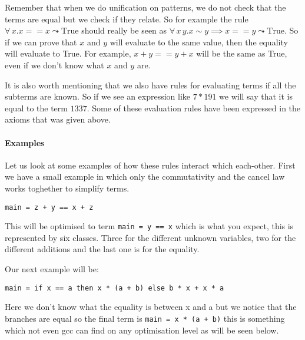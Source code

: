 Remember that when we do unification on patterns, we do not check that the terms
are equal but we check if they relate. So for example the rule $\forall \, x. x == x \leadsto \text{True}$
should really be seen as $\forall \, x \, y. x \sim y \implies x == y \leadsto \text{True}$.
So if we can prove that $x$ and $y$ will evaluate to the same value, then the equality
will evaluate to True. For example, $x + y == y + x$ will be the same as True, even
if we don't know what $x$ and $y$ are.

It is also worth mentioning that we also have rules for evaluating terms if all
the subterms are known. So if we see an expression like $7 * 191$ we will say that
it is equal to the term $1337$. Some of these evaluation rules have been expressed
in the axioms that was given above.

\paragraph{Examples}

Let us look at some examples of how these rules interact which each-other. First
we have a small example in which only the commutativity and the cancel law works
toghether to simplify terms.

\begin{verbatim}
main = z + y == x + z
\end{verbatim}

This will be optimised to term \verb|main = y == x| which is what you expect, this
is represented by six classes. Three for the different unknown variables, two
for the different additions and the last one is for the equality. 

Our next example will be:

\begin{verbatim}
main = if x == a then x * (a + b) else b * x + x * a
\end{verbatim}

Here we don't know what the equality is between x and a but we notice that the branches
are equal so the final term is \verb"main = x * (a + b)" this is something which
not even gcc can find on any optimisation level as will be seen below.

